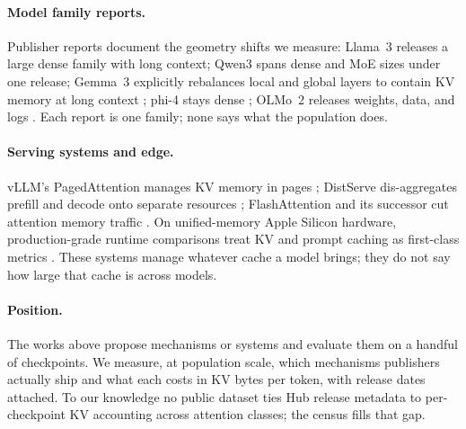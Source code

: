 \paragraph{Model family reports.}
Publisher reports document the geometry shifts we measure: Llama~3
\cite{grattafiori2024llama3} releases a large dense family with long context;
Qwen3 \cite{yang2025qwen3} spans dense and MoE sizes under one release; Gemma~3
explicitly rebalances local and global layers to contain KV memory at long
context \cite{gemmateam2025gemma3}; phi-4 stays dense \cite{abdin2024phi4};
OLMo~2 releases weights, data, and logs \cite{olmo2024olmo2}. Each report is
one family; none says what the population does.

\paragraph{Serving systems and edge.}
vLLM's PagedAttention manages KV memory in pages \cite{kwon2023paged};
DistServe dis-aggregates prefill and decode onto separate resources
\cite{zhong2024distserve}; FlashAttention and its successor cut attention
memory traffic \cite{dao2022flashattention,dao2023flashattention2}. On
unified-memory Apple Silicon hardware, production-grade runtime comparisons treat KV
and prompt caching as first-class metrics \cite{rajesh2025edgemem}. These systems manage whatever
cache a model brings; they do not say how large that cache is across models.

\paragraph{Position.}
The works above propose mechanisms or systems and evaluate them on a handful
of checkpoints. We measure, at population scale, which mechanisms publishers
actually ship and what each costs in KV bytes per token, with release dates
attached. To our knowledge no public dataset ties Hub release metadata to
per-checkpoint KV accounting across attention classes; the census fills that
gap.
